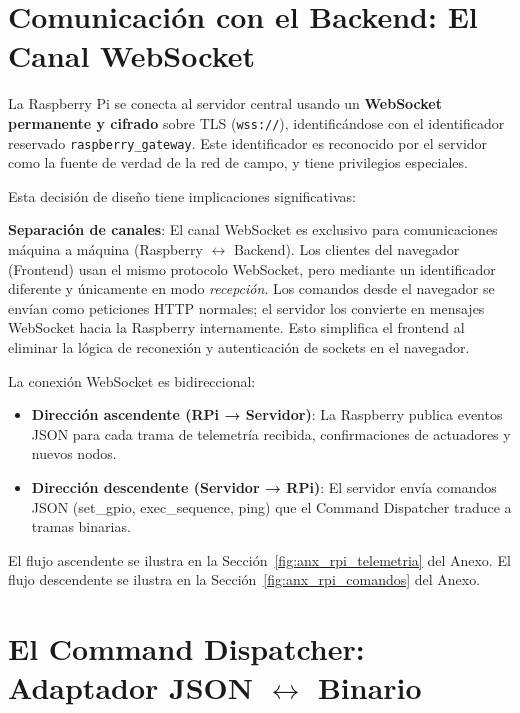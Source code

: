 \section{Comunicación con el Backend: El Canal WebSocket}

La Raspberry Pi se conecta al servidor central usando un \textbf{WebSocket permanente y cifrado} 
sobre TLS (\texttt{wss://}), identificándose con el identificador reservado 
\texttt{raspberry\_gateway}. Este identificador es reconocido por el servidor como la fuente 
de verdad de la red de campo, y tiene privilegios especiales.

Esta decisión de diseño tiene implicaciones significativas:

\begin{designnote}
\textbf{Separación de canales}: El canal WebSocket es exclusivo para comunicaciones máquina a 
máquina (Raspberry $\leftrightarrow$ Backend). Los clientes del navegador (Frontend) usan el mismo protocolo 
WebSocket, pero mediante un identificador diferente y únicamente en modo \textit{recepción}. 
Los comandos desde el navegador se envían como peticiones HTTP normales; el servidor los 
convierte en mensajes WebSocket hacia la Raspberry internamente. Esto simplifica el frontend 
al eliminar la lógica de reconexión y autenticación de sockets en el navegador.
\end{designnote}

La conexión WebSocket es bidireccional:
\begin{itemize}[leftmargin=*, label=--]
    \item \textbf{Dirección ascendente (RPi → Servidor)}: La Raspberry publica eventos JSON 
          para cada trama de telemetría recibida, confirmaciones de actuadores y nuevos nodos.
    \item \textbf{Dirección descendente (Servidor → RPi)}: El servidor envía comandos JSON 
          (set\_gpio, exec\_sequence, ping) que el Command Dispatcher traduce a tramas binarias.
\end{itemize}

El flujo ascendente se ilustra en la Sección~\ref{fig:anx_rpi_telemetria} del Anexo.
El flujo descendente se ilustra en la Sección~\ref{fig:anx_rpi_comandos} del Anexo.


\section{El Command Dispatcher: Adaptador JSON $\leftrightarrow$ Binario}

